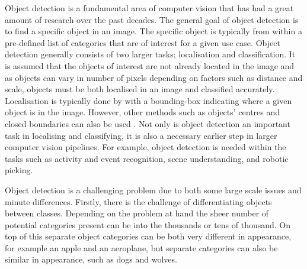\begin{comment}
	- fundamental problem in CV
		- much work over previous decades
	- goal: find specific category in a given image
		- of interest by itself. Localise and classification
		- also a pre-requisite step to higher-level vision tasks
			- activity & event recognition, scene understanding, + find more
	- difficulties 
		- inter-class differences small
		- intra-class variations large
			- shape, pose, colour, texture, background, differences in illumination/viewpoint etc between images
	- GPU/deep learning advances have meant that performance is starting to become satisfactory for real-world use in scenarios requiring high precision and accuracy
		- autonomous vehicles, military, medicinal
	- much discussion of AI taking labor jobs
		- find articles and specific examples
			- elon musk, bill gates, etc (leaders of tech)
		- object detection needed
		- improvements still to be made before being completely realised
	- next section, overview of object detection definition, key task and challenges within. Also SOTA related work
\end{comment}


Object detection is a fundamental area of computer vision that has had a great amount of research over the past decades. The general goal of object detection is to find a specific object in an image. The specific object is typically from within a pre-defined list of categories that are of interest for a given use case. Object detection generally consists of two larger tasks; localisation and classification. It is assumed that the objects of interest are not already located in the image and as objects can vary in number of pixels depending on factors such as distance and scale, objects must be both localised in an image and classified accurately. Localisation is typically done by with a bounding-box indicating where a given object is in the image. However, other methods such as objects' centres and closed boundaries can also be used \cite{zhang}. Not only is object detection an important task in localising and classifying, it is also a necessary earlier step in larger computer vision pipelines. For example, object detection is needed within the tasks such as activity and event recognition, scene understanding, and robotic picking.

Object detection is a challenging problem due to both some large scale issues and minute differences. Firstly, there is the challenge of differentiating objects between classes. Depending on the problem at hand the sheer number of potential categories present can be into the thousands or tens of thousand. On top of this separate object categories can be both very different in appearance, for example an apple and an aeroplane, but separate categories can also be similar in appearance, such as dogs and wolves.


